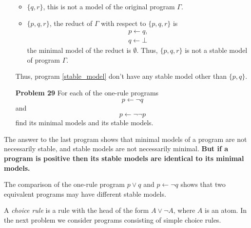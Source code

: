 \begin{enumerate}
\begin{itemize}
\item $\{q, r\}$, this is not a model of the original program $\Gamma$. 

\item $\{p, q, r\}$, the reduct of $\Gamma$ with respect to $\{p, q, r\}$ is
\begin{equation*}
\begin{gathered}
p \leftarrow q,  \\
q \leftarrow \bot
\end{gathered}
\end{equation*}
the minimal model of the reduct is $\emptyset$. Thus, $\{p, q, r\}$ is not a stable model of program $\Gamma$. 
\end{itemize}
Thus, program \eqref{stable_model} don't have any stable model other than $\{p, q\}$.
\newpage

\item[\textbf{Problem 29}] For each of the one-rule programs
\begin{equation*}
 p \leftarrow \neg q
\end{equation*}
and 
\begin{equation*}
 p \leftarrow \neg\neg p
\end{equation*}
find its minimal models and its stable models. 
\end{enumerate}




The answer to the last program shows that minimal models of a program are not necessarily stable, and stable models are not necessarily minimal. \textbf{But if a program is positive then its stable models are identical to its minimal models. }

The comparison of the one-rule program $p \vee q$ and $p \leftarrow \neg q$ shows that two equivalent programs may have different stable models. 

A \textit{choice rule} is a rule with the head of the form $A \vee \neg A$, where $A$ is an atom. In the next problem we consider programs consisting of simple choice rules. 

